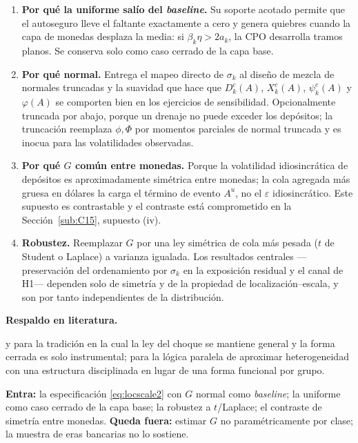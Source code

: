 \documentclass[11pt]{article}
\newcommand{\lit}{\par\noindent\textbf{Respaldo en literatura.}\par}
\theoremstyle{definition}
\begin{document}
\begin{enumerate}[leftmargin=*,itemsep=2pt]
\item \textbf{Por qu\'e la uniforme sal\'io del \emph{baseline}.} Su soporte acotado
permite que el autoseguro lleve el faltante exactamente a cero y genera quiebres
cuando la capa de monedas desplaza la media: si $\beta_k\eta>2a_k$, la CPO
desarrolla tramos planos. Se conserva solo como caso cerrado de la capa base.
\item \textbf{Por qu\'e normal.} Entrega el mapeo directo de $\sigma_k$ al dise\~no
de mezcla de normales truncadas y la suavidad que hace que $D^c_k(A)$,
$X^c_k(A)$, $\psi^c_k(A)$ y $\varphi(A)$ se comporten bien en los ejercicios de
sensibilidad. Opcionalmente truncada por abajo, porque un drenaje no puede
exceder los dep\'ositos; la truncaci\'on reemplaza $\phi,\Phi$ por momentos
parciales de normal truncada y es inocua para las volatilidades observadas.
\item \textbf{Por qu\'e $G$ com\'un entre monedas.} Porque la volatilidad
idiosincr\'atica de dep\'ositos es aproximadamente sim\'etrica entre monedas; la cola
agregada m\'as gruesa en d\'olares la carga el t\'ermino de evento $A^u$, no el
$\varepsilon$ idiosincr\'atico. Este supuesto es contrastable y el contraste est\'a
comprometido en la Secci\'on~\ref{sub:C15}, supuesto (iv).
\item \textbf{Robustez.} Reemplazar $G$ por una ley sim\'etrica de cola m\'as pesada
($t$ de Student o Laplace) a varianza igualada. Los resultados centrales
---preservaci\'on del ordenamiento por $\sigma_k$ en la exposici\'on residual y el
canal de H1--- dependen solo de simetr\'ia y de la propiedad de
localizaci\'on--escala, y son por tanto independientes de la distribuci\'on.
\end{enumerate}

\lit
\citet{poole1968} y \citet{baltensperger1980} para la tradici\'on en la cual la ley
del choque se mantiene general y la forma cerrada es solo instrumental;
\citet{bonhomme2022} para la l\'ogica paralela de aproximar heterogeneidad con una
estructura disciplinada en lugar de una forma funcional por grupo.

\begin{ie2}
\textbf{Entra:} la especificaci\'on \eqref{eq:locscale2} con $G$ normal como
\emph{baseline}; la uniforme como caso cerrado de la capa base; la robustez a
$t$/Laplace; el contraste de simetr\'ia entre monedas.
\textbf{Queda fuera:} estimar $G$ no param\'etricamente por clase; la muestra de
eras bancarias no lo sostiene.
\end{ie2}
\end{document}
